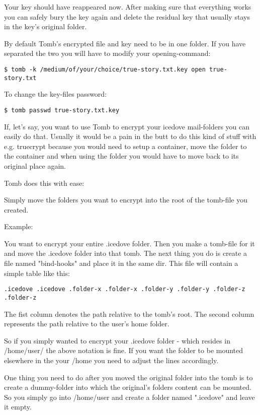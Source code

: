 \documentclass{article}
\begin{document}
 Your key should have reappeared now. After making sure that everything works you can safely bury the key again and delete the residual key that usually stays in the key's original folder. 


 By default Tomb's encrypted file and key need to be in one folder. If you have separated the two you will have to modify your opening-command:
\begin{lstlisting}
$ tomb -k /medium/of/your/choice/true-story.txt.key open true-story.txt
\end{lstlisting}



 To change the key-files password:
\begin{lstlisting}
$ tomb passwd true-story.txt.key
\end{lstlisting}



 If, let's say, you want to use Tomb to encrypt your icedove mail-folders you can easily do that. Usually it would be a pain in the butt to do this kind of stuff with e.g. truecrypt because you would need to setup a container, move the folder to the container and when using the folder you would have to move back to its original place again. 


 Tomb does this with ease:


 Simply move the folders you want to encrypt into the root of the tomb-file you created. 


 Example:


 You want to encrypt your entire .icedove folder. Then you make a tomb-file for it and move the .icedove folder into that tomb. The next thing you do is create a file named "bind-hooks" and place it in the same dir. This file will contain a simple table like this:
\begin{lstlisting}
.icedove .icedove .folder-x .folder-x .folder-y .folder-y .folder-z .folder-z
\end{lstlisting}



 The fist column denotes the path relative to the tomb's root. The second column represents the path relative to the user's home folder.


 So if you simply wanted to encrypt your .icedove folder - which resides in /home/user/ the above notation is fine. If you want the folder to be mounted elsewhere in the your /home you need to adjust the lines accordingly. 


 One thing you need to do after you moved the original folder into the tomb is to create a dummy-folder into which the original's folders content can be mounted. So you simply go into /home/user and create a folder named ".icedove" and leave it empty. 
\end{document}
